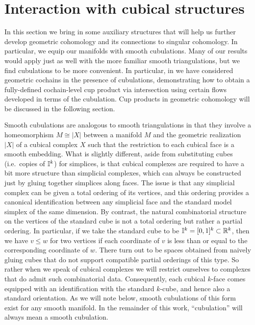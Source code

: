 







\section{Interaction with cubical structures}
\label{S: transversality}

In this section we bring in some auxiliary structures that will help us further develop geometric cohomology and its connections to singular cohomology. In particular, we equip our manifolds with smooth cubulations. Many of our results would apply just as well with the more familiar smooth triangulations, but we find cubulations to be more convenient. In particular, in \cite{FMS-flows} we have considered geometric cochains in the presence of cubulations, demonstrating how to obtain a fully-defined cochain-level cup product via intersection using certain flows developed in terms of the cubulation. Cup products in geometric cohomology will be discussed in the following section.

Smooth cubulations are analogous to smooth triangulations in that they involve a homeomorphism $M \cong |X|$ between a manifold $M$ and the geometric realization $|X|$ of a cubical complex $X$ such that the restriction to each cubical face is a smooth embedding. What is slightly different, aside from substituting cubes (i.e.\ copies of $\mathbb{I}^k$) for simplices, is that cubical complexes are required to have a bit more structure than simplicial complexes, which can always be constructed just by gluing together simplices along faces. The issue is that any simplicial complex can be given a total ordering of its vertices, and this ordering provides a canonical identification between any simplicial face and the standard model simplex of the same dimension. By contrast, the natural combinatorial structure on the vertices of the standard cube is not a total ordering but rather a partial ordering. In particular, if we take the standard cube to be $\mathbb{I}^k = [0,1]^k \subset \mathbb{R}^k$, then we have $v\leq w$ for two vertices if each coordinate of $v$ is less than or equal to the corresponding coordinate of $w$. There turn out to be spaces obtained from naively gluing cubes that do not support compatible partial orderings of this type. So rather when we speak of cubical complexes we will restrict ourselves to complexes that do admit such combinatorial data.
Consequently, each cubical $k$-face comes equipped with an identification with the standard $k$-cube, and hence also a standard orientation. As we will note below, smooth cubulations of this form exist for any smooth manifold. In the remainder of this work, ``cubulation'' will always mean a smooth cubulation.

